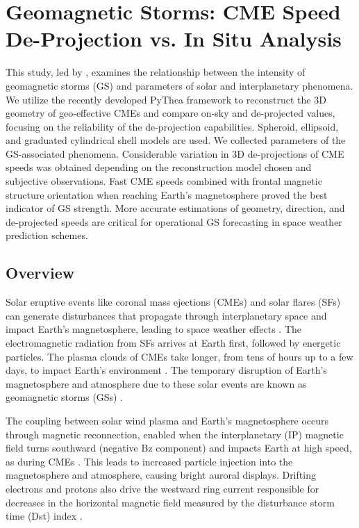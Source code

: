 \section{Geomagnetic Storms: CME Speed De-Projection vs. In Situ Analysis}
This study, led by \citet{miteva_2023}, examines the relationship between the intensity of geomagnetic storms (GS) and parameters of solar and interplanetary phenomena. We utilize the recently developed PyThea framework to reconstruct the 3D geometry of geo-effective CMEs and compare on-sky and de-projected values, focusing on the reliability of the de-projection capabilities. Spheroid, ellipsoid, and graduated cylindrical shell models are used. We collected parameters of the GS-associated phenomena. Considerable variation in 3D de-projections of CME speeds was obtained depending on the reconstruction model chosen and subjective observations. Fast CME speeds combined with frontal magnetic structure orientation when reaching Earth's magnetosphere proved the best indicator of GS strength. More accurate estimations of geometry, direction, and de-projected speeds are critical for operational GS forecasting in space weather prediction schemes.

\subsection{Overview}
Solar eruptive events like coronal mass ejections (CMEs) and solar flares (SFs) can generate disturbances that propagate through interplanetary space and impact Earth's magnetosphere, leading to space weather effects \citep{fletcher_2011, webb_2012, klein_2017, temmer_2021}. The electromagnetic radiation from SFs arrives at Earth first, followed by energetic particles. The plasma clouds of CMEs take longer, from tens of hours up to a few days, to impact Earth's environment \citep{malandraki_2018, gopalswamy_sun_sw_2022}. The temporary disruption of Earth's magnetosphere and atmosphere due to these solar events are known as geomagnetic storms (GSs) \citep{gonzalez_1994, saiz_2013, lakhina_2016}.

The coupling between solar wind plasma and Earth's magnetosphere occurs through magnetic reconnection, enabled when the interplanetary (IP) magnetic field turns southward (negative Bz component) and impacts Earth at high speed, as during CMEs \citep{dungey_1961, akasofu_1981, echer_2022}. This leads to increased particle injection into the magnetosphere and atmosphere, causing bright auroral displays. Drifting electrons and protons also drive the westward ring current responsible for decreases in the horizontal magnetic field measured by the disturbance storm time (Dst) index \citep{gonzalez_1994, saiz_2013, lakhina_2016}.

